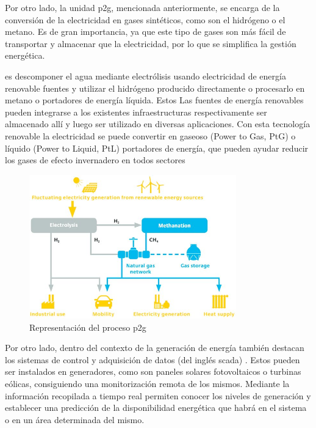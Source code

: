 Por otro lado, la unidad \gls{p2g}, mencionada anteriormente, se encarga de la conversión de la electricidad en gases sintéticos, como son el hidrógeno o el metano. Es de gran importancia, ya que este tipo de gases son más fácil de transportar y almacenar que la electricidad, por lo que se simplifica la gestión energética. \cite{transactive}


es descomponer el agua mediante
electrólisis usando electricidad
de energía renovable
fuentes y utilizar el hidrógeno
producido directamente o
procesarlo en metano o
portadores de energía líquida. Estos
Las fuentes de energía renovables pueden
integrarse a los existentes
infraestructuras respectivamente
ser almacenado allí y luego ser
utilizado en diversas aplicaciones.
Con esta tecnología renovable
la electricidad se puede convertir en
gaseoso (Power to Gas, PtG)
o líquido (Power to Liquid, PtL)
portadores de energía, que pueden ayudar
reducir los gases de efecto invernadero en todos
sectores



\vspace{3mm}

\begin{figure}[h]
  \centering
  \includegraphics[width=0.8\textwidth]{img/teoria/p2g.jpg}
  \caption{Representación del proceso \gls{p2g} \cite{p2g}}
  \label{fig:p2g}
\end{figure}




\vspace{3mm}

Por otro lado, dentro del contexto de la generación de energía también destacan los sistemas de control y adquisición de datos (del inglés \gls{scada}) \cite{scada}. Estos pueden ser instalados en generadores, como son paneles solares fotovoltaicos o turbinas eólicas, consiguiendo una monitorización remota de los mismos. Mediante la información recopilada a tiempo real permiten conocer los niveles de generación y establecer una predicción de la disponibilidad energética que habrá en el sistema o en un área determinada del mismo.

